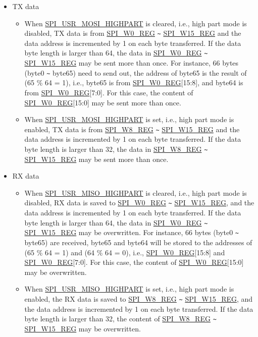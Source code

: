 \documentclass[main\_\_EN.tex]{subfiles}
\begin{document}
\begin{itemize}
    \item TX data
    \begin{itemize}
        \item When \hyperref[fielddesc:SPIUSRMOSIHIGHPART]{SPI\_USR\_MOSI\_HIGHPART} is cleared, i.e., high part mode is disabled, TX data is from \hyperref[regdesc:SPIW0REG]{SPI\_W0\_REG} \verb+~+ \hyperref[regdesc:SPIW15REG]{SPI\_W15\_REG} and the data address is incremented by 1 on each byte transferred. If the data byte length is larger than 64, the data in \hyperref[regdesc:SPIW0REG]{SPI\_W0\_REG} \verb+~+ \hyperref[regdesc:SPIW15REG]{SPI\_W15\_REG} may be sent more than once. For instance, 66 bytes (byte0 \verb+~+ byte65) need to send out, the address of byte65 is the result of (65 \% 64 = 1), i.e., byte65 is from \hyperref[regdesc:SPIW0REG]{SPI\_W0\_REG}[15:8], and byte64 is from \hyperref[regdesc:SPIW0REG]{SPI\_W0\_REG}[7:0]. For this case, the content of \hyperref[regdesc:SPIW0REG]{SPI\_W0\_REG}[15:0] may be sent more than once.
        \item When \hyperref[fielddesc:SPIUSRMOSIHIGHPART]{SPI\_USR\_MOSI\_HIGHPART} is set, i.e., high part mode is enabled, TX data is from \hyperref[regdesc:SPIW8REG]{SPI\_W8\_REG} \verb+~+ \hyperref[regdesc:SPIW15REG]{SPI\_W15\_REG} and the data address is incremented by 1 on each byte transferred. If the data byte length is larger than 32, the data in \hyperref[regdesc:SPIW8REG]{SPI\_W8\_REG} \verb+~+ \hyperref[regdesc:SPIW15REG]{SPI\_W15\_REG} may be sent more than once.
    \end{itemize}
    \item RX data
    \begin{itemize}
        \item When \hyperref[fielddesc:SPIUSRMISOHIGHPART]{SPI\_USR\_MISO\_HIGHPART} is cleared, i.e., high part mode is disabled, RX data is saved to \hyperref[regdesc:SPIW0REG]{SPI\_W0\_REG} \verb+~+ \hyperref[regdesc:SPIW15REG]{SPI\_W15\_REG}, and the data address is incremented by 1 on each byte transferred. If the data byte length is larger than 64, the data in \hyperref[regdesc:SPIW15REG]{SPI\_W0\_REG} \verb+~+ \hyperref[regdesc:SPIW15REG]{SPI\_W15\_REG} may be overwritten. For instance, 66 bytes (byte0 \verb+~+ byte65) are received, byte65 and byte64 will be stored to the addresses of (65 \% 64 = 1) and (64 \% 64 = 0), i.e., \hyperref[regdesc:SPIW0REG]{SPI\_W0\_REG}[15:8] and \hyperref[regdesc:SPIW0REG]{SPI\_W0\_REG}[7:0]. For this case, the content of \hyperref[regdesc:SPIW0REG]{SPI\_W0\_REG}[15:0] may be overwritten.
        \item When \hyperref[fielddesc:SPIUSRMISOHIGHPART]{SPI\_USR\_MISO\_HIGHPART} is set, i.e., high part mode is enabled, the RX data is saved to \hyperref[regdesc:SPIW8REG]{SPI\_W8\_REG} \verb+~+ \hyperref[regdesc:SPIW15REG]{SPI\_W15\_REG}, and the data address is incremented by 1 on each byte transferred. If the data byte length is larger than 32, the content of \hyperref[regdesc:SPIW8REG]{SPI\_W8\_REG} \verb+~+ \hyperref[regdesc:SPIW15REG]{SPI\_W15\_REG} may be overwritten.
    \end{itemize}
\end{itemize}
\end{document}

